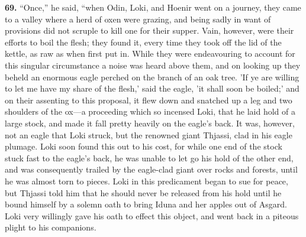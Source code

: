 \textbf{69.} ``Once,'' he said, ``when Odin, Loki, and Hoenir went on a journey,
they came to a valley where a herd of oxen were grazing, and being
sadly in want of provisions did not scruple to kill one for their
supper. Vain, however, were their efforts to boil the flesh; they
found it, every time they took off the lid of the kettle, as raw as
when first put in. While they were endeavouring to account for this
singular circumstance a noise was heard above them, and on looking up
they beheld an enormous eagle perched on the branch of an oak tree.
'If ye are willing to let me have my share of the flesh,' said the
eagle, 'it shall soon be boiled;' and on their assenting to this
proposal, it flew down and snatched up a leg and two shoulders of the
ox—a proceeding which so incensed Loki, that he laid hold of a large
stock, and made it fall pretty heavily on the eagle's back. It was,
however, not an eagle that Loki struck, but the renowned giant
Thjassi, clad in his eagle plumage. Loki soon found this out to his
cost, for while one end of the stock stuck fast to the eagle's back,
he was unable to let go his hold of the other end, and was
consequently trailed by the eagle-clad giant over rocks and forests,
until he was almost torn to pieces. Loki in this predicament began to
sue for peace, but Thjassi told him that he should never be released
from his hold until he bound himself by a solemn oath to bring Iduna
and her apples out of Asgard. Loki very willingly gave his oath to
effect this object, and went back in a piteous plight to his
companions.

